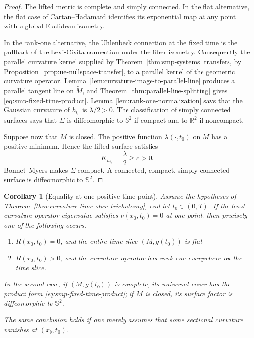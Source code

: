 \documentclass[10pt]{coll-l}
\newcommand{\R}{\mathbb{R}}
\newcommand{\Sph}{\mathbb{S}}
\newtheorem{corollary}[theorem]{Corollary}
\theoremstyle{definition}
\theoremstyle{remark}
\numberwithin{section}{chapter}
\numberwithin{equation}{chapter}
\begin{document}
\begin{proof}
The lifted metric is complete and simply connected.  In the flat
alternative, the flat case of Cartan--Hadamard identifies its exponential
map at any point with a global Euclidean isometry.

In the rank-one alternative, the Uhlenbeck connection at the fixed time is
the pullback of the Levi-Civita connection under the fiber isometry.
Consequently the parallel curvature kernel supplied by
Theorem~\ref{thm:smp-systems} transfers, by
Proposition~\ref{prop:ue-nullspace-transfer}, to a parallel kernel of the
geometric curvature operator.  Lemma~\ref{lem:curvature-image-to-parallel-line}
produces a parallel tangent line on $\widetilde M$, and
Theorem~\ref{thm:parallel-line-splitting} gives
\eqref{eq:smp-fixed-time-product}.  Lemma
\ref{lem:rank-one-normalization} says that the Gaussian curvature of
$h_{t_0}$ is $\lambda/2>0$.  The classification of simply connected
surfaces says that $\Sigma$ is diffeomorphic to $\Sph^2$ if compact and to
$\R^2$ if noncompact.

Suppose now that $M$ is closed.  The positive function $\lambda(\cdot,t_0)$
on $M$ has a positive minimum.  Hence the lifted surface satisfies
\[
                    K_{h_{t_0}}=\frac{\lambda}{2}\geq c>0.
\]
Bonnet--Myers makes $\Sigma$ compact.  A connected, compact, simply
connected surface is diffeomorphic to $\Sph^2$.
\end{proof}

\begin{corollary}[Equality at one positive-time point]
\label{cor:curvature-zero-eigenvalue-splitting}
Assume the hypotheses of
Theorem~\ref{thm:curvature-time-slice-trichotomy}, and let
$t_0\in(0,T)$.  If the least curvature-operator eigenvalue satisfies
$\nu(x_0,t_0)=0$ at one point, then precisely one of the following occurs.
\begin{enumerate}
\item $R(x_0,t_0)=0$, and the entire time slice $(M,g(t_0))$ is flat.
\item $R(x_0,t_0)>0$, and the curvature operator has rank one everywhere on
      the time slice.
\end{enumerate}
In the second case, if $(M,g(t_0))$ is complete, its universal cover has the
product form \eqref{eq:smp-fixed-time-product}; if $M$ is closed, its surface
factor is diffeomorphic to $\Sph^2$.

The same conclusion holds if one merely assumes that some sectional
curvature vanishes at $(x_0,t_0)$.
\end{corollary}
\end{document}
